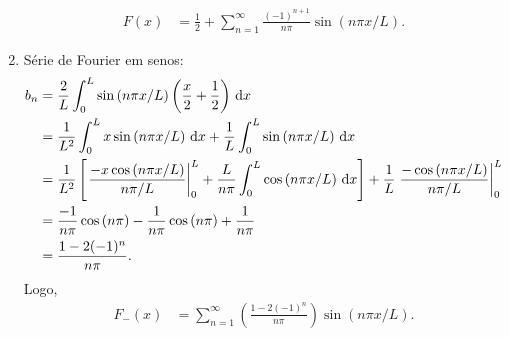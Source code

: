 \begin{exem}
\begin{enumerate}
\begin{align*}
                F(x) &= \frac{1}{2} + \sum_{n = 1}^\infty \frac{(-1)^{n + 1}}{n \pi} \sin\left( n \pi x / L \right).
            \end{align*}
            \begin{center}
            \end{center}

        \item S\'{e}rie de Fourier em senos:
            \begin{align*}
                b_n &= \frac{2}{L} \int_0^L \sin\left( n \pi x / L \right) \left( \frac{x}{2} + \frac{1}{2} \right) \, \mathrm{d}x \\
                &= \frac{1}{L^2} \int_0^L x \sin\left( n \pi x / L \right) \, \mathrm{d}x + \frac{1}{L} \int_0^L \sin\left( n \pi x / L \right) \, \mathrm{d}x \\
                &= \frac{1}{L^2} \left[ \left. \frac{- x \cos\left( n \pi x / L \right)}{n \pi / L} \right|_0^L + \frac{L}{n \pi} \int_0^L \cos\left( n \pi x / L \right) \, \mathrm{d}x \right] + \frac{1}{L} \left. \frac{- \cos\left( n \pi x / L \right)}{n \pi / L} \right|_0^L \\
                &= \frac{-1}{n \pi} \cos\left( n \pi \right) - \frac{1}{n \pi} \cos\left( n \pi \right) + \frac{1}{n \pi} \\
                &= \frac{1 - 2 (-1)^n}{n \pi}.
            \end{align*}
            Logo,
            \begin{align*}
                F_-(x) &= \sum_{n = 1}^\infty \left( \frac{1 - 2 (-1)^n}{n \pi} \right) \sin\left( n \pi x / L \right).
            \end{align*}


\end{enumerate}
\end{exem}
